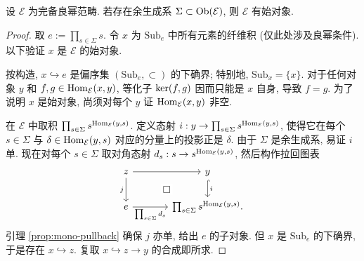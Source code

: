 \begin{lemma}\label{prop:cogenerator-initial-obj}
	设 $\mathcal{E}$ 为完备良幂范畴. 若存在余生成系 $\Sigma \subset \operatorname{Ob}(\mathcal{E})$, 则 $\mathcal{E}$ 有始对象.
\end{lemma}
\begin{proof}
	取 $e := \prod_{s \in \Sigma} s$. 令 $x$ 为 $\mathrm{Sub}_e$ 中所有元素的纤维积 (仅此处涉及良幂条件). 以下验证 $x$ 是 $\mathcal{E}$ 的始对象.
	
	按构造, $x \hookrightarrow e$ 是偏序集 $(\mathrm{Sub}_e, \subset)$ 的下确界; 特别地, $\mathrm{Sub}_x = \{x\}$. 对于任何对象 $y$ 和 $f, g \in \operatorname{Hom}_{\mathcal{E}}(x, y)$, 等化子 $\operatorname{ker}(f, g)$ 因而只能是 $x$ 自身, 导致 $f=g$. 为了说明 $x$ 是始对象, 尚须对每个 $y$ 证 $\operatorname{Hom}_{\mathcal{E}}(x, y)$ 非空.
	
	在 $\mathcal{E}$ 中取积 $\prod_{s \in \Sigma} s^{\operatorname{Hom}_{\mathcal{E}}(y, s)}$. 定义态射 $i: y \to \prod_{s \in \Sigma} s^{\operatorname{Hom}_{\mathcal{E}}(y, s)}$, 使得它在每个 $s \in \Sigma$ 与 $\delta \in \operatorname{Hom}_{\mathcal{E}}(y, s)$ 对应的分量上的投影正是 $\delta$. 由于 $\Sigma$ 是余生成系, 易证 $i$ 单. 现在对每个 $s \in \Sigma$ 取对角态射 $d_s: s \to s^{\operatorname{Hom}_{\mathcal{E}}(y, s)}$, 然后构作拉回图表
	\[\begin{tikzcd}[column sep=large]
		z \arrow[r] \arrow[d, "j"'] & y \arrow[hookrightarrow, d, "i"] \arrow[phantom, ld, "\Box" description] \\
		e \arrow[r, "{\prod_{s \in \Sigma} d_s}"'] &  \prod_{s \in \Sigma} s^{\Hom_{\mathcal{E}}(y, s)}.
	\end{tikzcd}\]
	引理 \ref{prop:mono-pullback} 确保 $j$ 亦单, 给出 $e$ 的子对象. 但 $x$ 是 $\mathrm{Sub}_e$ 的下确界, 于是存在 $x \hookrightarrow z$. 复取 $x \hookrightarrow z \to y$ 的合成即所求.
\end{proof}

